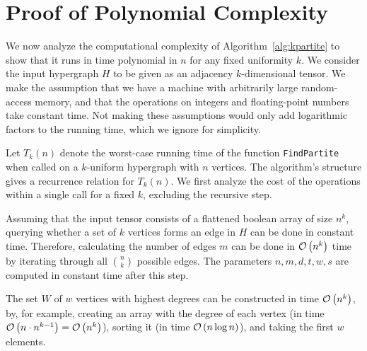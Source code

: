 \section{Proof of Polynomial Complexity}\label{sec:complexity}

We now analyze the computational complexity of Algorithm~\ref{alg:kpartite} to show that it runs in time polynomial in $n$ for any fixed uniformity $k$.
We consider the input hypergraph $H$ to be given as an adjacency $k$-dimensional tensor.
We make the assumption that we have a machine with arbitrarily large random-access memory,
and that the operations on integers and floating-point numbers take constant time.
Not making these assumptions would only add logarithmic factors to the running time, which we ignore for simplicity.

Let $T_k(n)$ denote the worst-case running time of the function \texttt{FindPartite} when called on a $k$-uniform hypergraph with $n$ vertices.
The algorithm's structure gives a recurrence relation for $T_k(n)$.
We first analyze the cost of the operations within a single call for a fixed $k$, excluding the recursive step.

Assuming that the input tensor consists of a flattened boolean array of size $n^k$,
querying whether a set of $k$ vertices forms an edge in $H$ can be done in constant time.
Therefore, calculating the number of edges $m$ can be done in $\mathcal{O}\left(n^k\right)$ time by iterating through all $\binom{n}{k}$ possible edges.
The parameters $n, m, d, t, w, s$ are computed in constant time after this step.

The set $W$ of $w$ vertices with highest degrees can be constructed in time $\mathcal{O}\left(n^k\right)$, by, for example,
creating an array with the degree of each vertex (in time  $\mathcal{O}\left(n \cdot n^{k-1}\right) = \mathcal{O}\left(n^k\right)$), sorting it (in time $\mathcal{O}\left(n \log n\right)$),
and taking the first $w$ elements.

